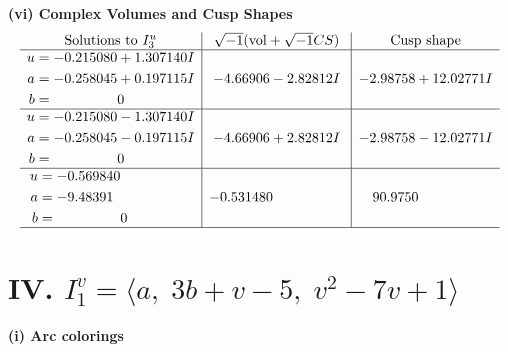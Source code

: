 \documentclass[1p]{elsarticle_modified}
\theoremstyle{definition}
\newcommand{\I}{\sqrt{-1}}
\begin{document}
\newpage\flushleft \textbf{(vi) Complex Volumes and Cusp Shapes}
$$\begin{array}{c|c|c}  
\text{Solutions to }I^u_{3}& \I (\text{vol} + \sqrt{-1}CS) & \text{Cusp shape}\\
 \hline 
\begin{aligned}
u &= -0.215080 + 1.307140 I \\
a &= -0.258045 + 0.197115 I \\
b &= \phantom{-0.000000 } 0\end{aligned}
 & -4.66906 - 2.82812 I & -2.98758 + 12.02771 I \\ \hline\begin{aligned}
u &= -0.215080 - 1.307140 I \\
a &= -0.258045 - 0.197115 I \\
b &= \phantom{-0.000000 } 0\end{aligned}
 & -4.66906 + 2.82812 I & -2.98758 - 12.02771 I \\ \hline\begin{aligned}
u &= -0.569840\phantom{ +0.000000I} \\
a &= -9.48391\phantom{ +0.000000I} \\
b &= \phantom{-0.000000 } 0\end{aligned}
 & -0.531480\phantom{ +0.000000I} & \phantom{-}90.9750\phantom{ +0.000000I}\\
 \hline 
 \end{array}$$\newpage\newpage\renewcommand{\arraystretch}{1}
\centering \section*{IV. $I^v_{1}= \langle a,\;3 b+v-5,\;v^2-7 v+1 \rangle$}
\flushleft \textbf{(i) Arc colorings}\\
\end{document}
